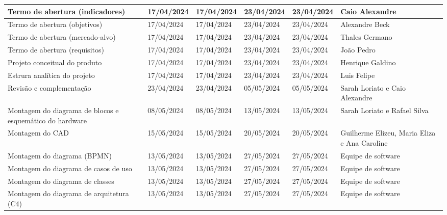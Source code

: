 \begin{xltabular}{\columnwidth}{X|X|X|X|X|X}
  Termo de abertura (indicadores) & 17/04/2024 & 17/04/2024 & 23/04/2024 & 23/04/2024 & Caio Alexandre \\
  \hline

  Termo de abertura (objetivos) & 17/04/2024 & 17/04/2024 & 23/04/2024 & 23/04/2024 & Alexandre Beck \\
  \hline

  Termo de abertura (mercado-alvo) & 17/04/2024 & 17/04/2024 & 23/04/2024 & 23/04/2024 & Thales Germano \\
  \hline

  Termo de abertura (requisitos) & 17/04/2024 & 17/04/2024 & 23/04/2024 & 23/04/2024 & João Pedro \\
  \hline

  Projeto conceitual do produto & 17/04/2024 & 17/04/2024 & 23/04/2024 & 23/04/2024 & Henrique Galdino \\
  \hline

  Estrura analítica do projeto & 17/04/2024 & 17/04/2024 & 23/04/2024 & 23/04/2024 & Luis Felipe \\
  \hline

  Revisão e complementação & 23/04/2024 & 23/04/2024 & 05/05/2024 & 05/05/2024 & Sarah Loriato e Caio Alexandre \\
  \hline

  Montagem do diagrama de blocos e esquemático do hardware & 08/05/2024 & 08/05/2024 & 13/05/2024 & 13/05/2024 & Sarah Loriato e Rafael Silva \\
  \hline

  Montagem do CAD & 15/05/2024 & 15/05/2024 & 20/05/2024 & 20/05/2024 & Guilherme Elizeu, Maria Eliza e Ana Caroline \\
  \hline

  Montagem do diagrama (BPMN) & 13/05/2024 & 13/05/2024 & 27/05/2024 & 27/05/2024 & Equipe de software \\
  \hline

  Montagem do diagrama de casos de uso & 13/05/2024 & 13/05/2024 & 27/05/2024 & 27/05/2024 & Equipe de software \\
  \hline

  Montagem do diagrama de classes & 13/05/2024 & 13/05/2024 & 27/05/2024 & 27/05/2024 & Equipe de software \\
  \hline

  Montagem do diagrama de arquitetura (C4) & 13/05/2024 & 13/05/2024 & 27/05/2024 & 27/05/2024 & Equipe de software \\
  \hline


\end{xltabular}
